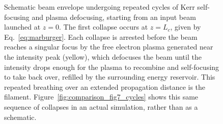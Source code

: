 \begin{figure}[h!]
{%
    }
    \caption{Schematic beam envelope undergoing repeated cycles of Kerr self-focusing and plasma defocusing, starting from an input beam launched at $z=0$. The first collapse occurs at $z=L_c$, given by Eq.~\eqref{eq:marburger}. Each collapse is arrested before the beam reaches a singular focus by the free electron plasma generated near the intensity peak (yellow), which defocuses the beam until the intensity drops enough for the plasma to recombine and self-focusing to take back over, refilled by the surrounding energy reservoir. This repeated breathing over an extended propagation distance is the filament. Figure~\ref{fig:comparison_fig7_cycles} shows this same sequence of collapses in an actual simulation, rather than as a schematic.}
    \label{fig:filamentation_schematic}
\end{figure}